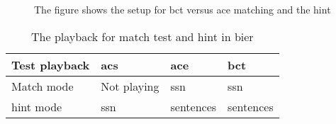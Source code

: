 \newpage
\begin{figure}[H]
	\begin{sideways}
	\begin{minipage}{\textheight}
		\centering
\def\svgwidth{\columnwidth}

	\end{minipage}
	\end{sideways}
\caption{The figure shows the setup for \gls{bct} versus \gls{ace} matching and the \gls{hint} }
\label{fig:sec_bier_setup}
\end{figure}


\begin{table}[H]
\centering
\caption{The playback for match test and \gls{hint} in \gls{bier}}
\begin{tabular}{l|lll}
Test playback   & \gls{acs}   & \gls{ace} & \gls{bct} \\ \hline
Match mode      & Not playing & \gls{ssn} & \gls{ssn} \\
\gls{hint} mode & \gls{ssn}   & sentences & sentences
\end{tabular}
\label{sec:playback_bier}
\end{table}


















